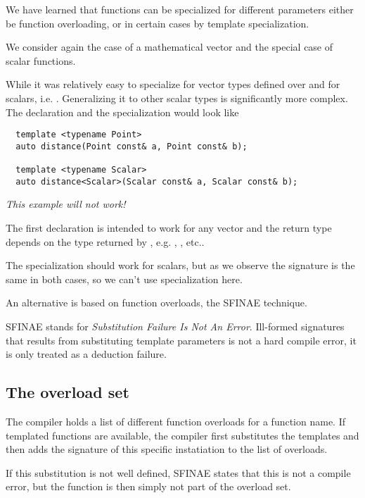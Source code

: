 We have learned that functions can be specialized for different
parameters either be function overloading, or in certain cases by
template specialization.

\begin{example}
  We consider again the case of a mathematical vector and the special
  case of scalar functions.

  While it was relatively easy to specialize  for vector
  types defined over  and for scalars, i.e. .
  Generalizing it to other scalar types is significantly more
  complex. The declaration and the specialization would look like

  \begin{verbatim}
  template <typename Point>
  auto distance(Point const& a, Point const& b);

  template <typename Scalar>
  auto distance<Scalar>(Scalar const& a, Scalar const& b);
  \end{verbatim}
  \emph{This example will not work!}

  The first declaration is intended to work for any vector and the
  return type depends on the type returned by ,
  e.g. , , etc..

  The specialization should work for scalars, but as we observe the
  signature is the same in both cases, so we can't use specialization
  here.
\end{example}

An alternative is based on function overloads, the SFINAE technique.

SFINAE stands for \emph{Substitution Failure Is Not An Error}. Ill-formed
signatures that results from substituting template parameters is not a
hard compile error, it is only treated as a deduction failure.

\subsection{The overload set}

The compiler holds a list of different function overloads for a
function name. If templated functions are available, the compiler first
substitutes the templates and then adds the signature of this specific
instatiation to the list of overloads.

If this substitution is not well defined, SFINAE states that this is
not a compile error, but the function is then simply not part of the
overload set.

